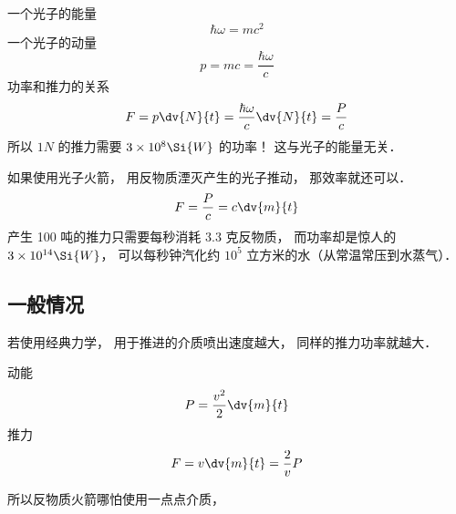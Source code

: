 
一个光子的能量
\begin{equation}
\hbar\omega = mc^2
\end{equation}
一个光子的动量
\begin{equation}
p = mc = \frac{\hbar\omega}{c}
\end{equation}
功率和推力的关系
\begin{equation}
F = p \dv{N}{t} = \frac{\hbar\omega}{c}\dv{N}{t} = \frac{P}{c}
\end{equation}
所以 $1N$ 的推力需要 $3\times 10^8\Si{W}$ 的功率！ 这与光子的能量无关．

如果使用光子火箭， 用反物质湮灭产生的光子推动， 那效率就还可以．
\begin{equation}
F = \frac{P}{c} = c\dv{m}{t}
\end{equation}
产生 100 吨的推力只需要每秒消耗 3.3 克反物质， 而功率却是惊人的 $3\times 10^{14}\Si{W}$， 可以每秒钟汽化约 $10^5$ 立方米的水（从常温常压到水蒸气）．

\subsection{一般情况}
若使用经典力学， 用于推进的介质喷出速度越大， 同样的推力功率就越大．

动能
\begin{equation}
P = \frac{v^2}{2}\dv{m}{t}
\end{equation}
推力
\begin{equation}
F = v\dv{m}{t} = \frac{2}{v} P
\end{equation}

所以反物质火箭哪怕使用一点点介质， 
